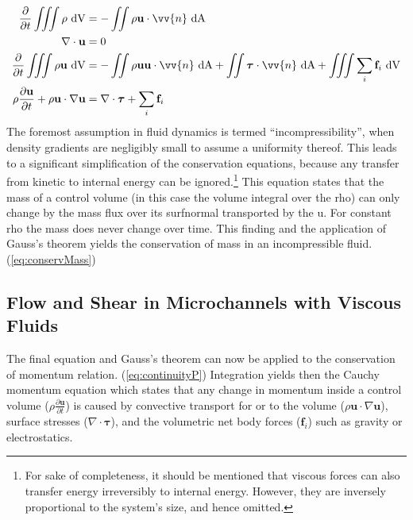 \begin{align}
	\frac{\partial}{\partial t} \iiint \rho \ \mathrm{dV} &= - \iint \rho \mathbf{u} \cdot \vv{n} \ \mathrm{dA} \label{eq:continuityM}\\
	\nabla \cdot \mathbf{u} &= 0 \label{eq:conservMass}\\	
	\frac{\partial}{\partial t} \iiint \rho\mathbf{u} \ \mathrm{dV} &= - \iint \rho \mathbf{u}\mathbf{u} \cdot \vv{n} \ \mathrm{dA} + \iint \boldsymbol{\tau} \cdot \vv{n} \ \mathrm{dA}  + \iiint  \sum_{i}\mathbf{f}_i \ \mathrm{dV} \label{eq:continuityP} \\	
		\rho \frac{\partial \mathbf{u}}{\partial t} + \rho\mathbf{u} \cdot \nabla \mathbf{u} &= \nabla \cdot \boldsymbol{\tau} + \sum_{i}\mathbf{f}_i \label{eq:cauchymomentum} \\			
\end{align}
The foremost assumption in fluid dynamics is termed ``incompressibility'', when density gradients are negligibly small to assume a uniformity thereof. This leads to a significant simplification of the conservation equations, because any transfer from kinetic to internal energy can be ignored.\footnote{For sake of completeness, it should be mentioned that viscous forces can also transfer energy irreversibly to internal energy. However, they are inversely proportional to the system's size, and hence omitted.}
This equation states that the mass of a control volume (in this case the volume integral over the \gls{rho}) can only change by the mass flux over its \gls{surfnormal} transported by the \gls{u}. For constant \gls{rho} the mass does never change over time. This finding and the application of Gauss's theorem yields the conservation of mass in an incompressible fluid. (\cref{eq:conservMass})


\subsection{Flow and Shear in Microchannels with Viscous Fluids}
\label{subs:flow_and_Shear}

The final equation and Gauss's theorem can now be applied to the conservation of momentum relation. (\cref{eq:continuityP}) Integration yields then the Cauchy momentum equation which states that any change in momentum inside a control volume ($\rho \frac{\partial \mathbf{u}}{\partial t}$) is caused by convective transport for or to the volume ($\rho\mathbf{u} \cdot \nabla \mathbf{u}$), surface stresses ($ \nabla \cdot \boldsymbol{\tau}$), and the volumetric net body forces ($\mathbf{f}_i$) such as gravity or electrostatics.

